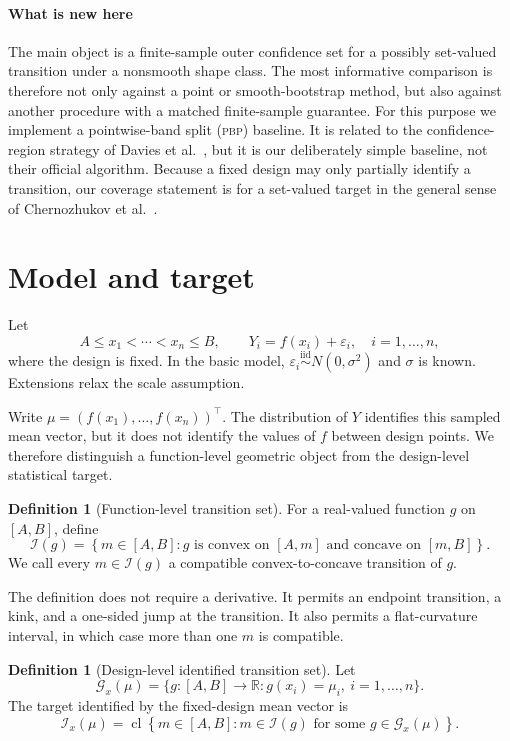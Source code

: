 \documentclass{interact}
\theoremstyle{definition}
\newtheorem{definition}[theorem]{Definition}
\theoremstyle{remark}
\newcommand{\R}{\mathbb{R}}
\newcommand{\I}{\mathcal{I}}
\newcommand{\PBP}{\textnormal{\textsc{pbp}}\xspace}
\begin{document}
\paragraph{What is new here}
The main object is a finite-sample outer confidence set for a possibly
set-valued transition under a nonsmooth shape class.  The most informative
comparison is therefore not only against a point or smooth-bootstrap method,
but also against another procedure with a matched finite-sample guarantee.
For this purpose we implement a pointwise-band split (\PBP) baseline.  It
is related to the confidence-region strategy of
Davies et al.~\citep{davies2009nonparametric}, but it is our deliberately simple baseline,
not their official algorithm.  Because a fixed design may only partially
identify a transition, our coverage statement is for a set-valued target in
the general sense of Chernozhukov et al.~\citep{chernozhukov2007estimation}.

\section{Model and target}
\label{sec:model}

Let
\[
  A \leq x_1 < \cdots < x_n \leq B,
  \qquad Y_i=f(x_i)+\varepsilon_i,
  \quad i=1,\ldots,n,
\]
where the design is fixed.  In the basic model,
$\varepsilon_i\stackrel{\mathrm{iid}}{\sim}N(0,\sigma^2)$ and $\sigma$ is
known.  Extensions relax the scale assumption.

Write $\mu=(f(x_1),\ldots,f(x_n))^\top$.  The distribution of $Y$ identifies
this sampled mean vector, but it does not identify the values of $f$ between
design points.  We therefore distinguish a function-level geometric object
from the design-level statistical target.

\begin{definition}[Function-level transition set]
For a real-valued function $g$ on $[A,B]$, define
\[
  \I(g)=\left\{m\in[A,B]:
  g\text{ is convex on }[A,m]\text{ and concave on }[m,B]\right\}.
\]
We call every $m\in\I(g)$ a compatible convex-to-concave transition of $g$.
\end{definition}

The definition does not require a derivative.  It permits an endpoint
transition, a kink, and a one-sided jump at the transition.  It also permits a
flat-curvature interval, in which case more than one $m$ is compatible.

\begin{definition}[Design-level identified transition set]
Let
\[
 \mathcal G_x(\mu)=
 \{g:[A,B]\to\R:g(x_i)=\mu_i,\ i=1,\ldots,n\}.
\]
The target identified by the fixed-design mean vector is
\begin{equation}
 \I_x(\mu)=\operatorname{cl}\!\left\{
 m\in[A,B]:m\in\I(g)\text{ for some }g\in\mathcal G_x(\mu)
 \right\}.
\label{eq:design-target}
\end{equation}
\end{definition}
\end{document}
